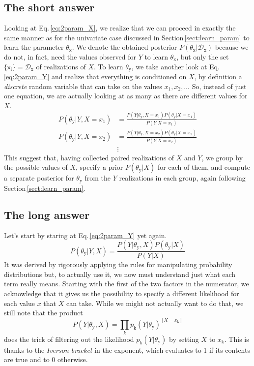 \documentclass[]{report}
\begin{document}
\subsection{The short answer}
Looking at Eq.\,\ref{eq:2param_X}, we realize that we can proceed in exactly the same manner as for the univariate case discussed in Section\,\ref{sect:learn_param} to learn the parameter $\theta_\mathrm{x}$. We denote the obtained posterior $P( \theta_\mathrm{x} | \mathcal{D}_\mathrm{x} ) $ because we do not, in fact, need the values observed for $Y$ to learn $\theta_\mathrm{x}$, but only the set $\{\mathsf{x}_\mathrm{i}\} = \mathcal{D}_\mathrm{x}$ of realizations of $X$. To learn $\theta_\mathrm{y}$, we take another look at Eq.\,\ref{eq:2param_Y} and realize that everything is conditioned on $X$, by definition a \emph{discrete} random variable that can take on the values $x_1, x_2, \ldots$ So, instead of just one equation, we are actually looking at as many as there are different values for $X$.
\begin{align}
P( \theta_\mathrm{y} | Y, X = x_1 )
&= 
\frac
	{
		P( Y | \theta_\mathrm{y}, X = x_1 )
		P( \theta_\mathrm{y} | X = x_1 )
	}
	{
		P( Y | X = x_1 )
	}
\nonumber \\
P( \theta_\mathrm{y} | Y, X = x_2 )
&=
\frac
	{
		P( Y | \theta_\mathrm{y}, X = x_2 )
		P( \theta_\mathrm{y} | X = x_2 )
	}
	{
		P( Y | X=x_2 )
	}
\\
&\vdots
\nonumber
\end{align}
This suggest that, having collected paired realizations of $X$ and $Y$, we group by the possible values of $X$, specify a prior $P( \theta_\mathrm{y} | X ) $ for each of them, and compute a separate posterior for $\theta_\mathrm{y}$ from the $Y$ realizations in each group, again following Section\,\ref{sect:learn_param}.


\subsection{The long answer}
Let's start by staring at Eq.\,\ref{eq:2param_Y} yet again.
\begin{equation*}
P( \theta_\mathrm{y} | Y, X ) 
=
\frac
	{
		P( Y | \theta_\mathrm{y}, X )
		P( \theta_\mathrm{y} | X )
	}
	{
		P( Y | X )
	}
\end{equation*}
It was derived by rigorously applying the rules for manipulating probability distributions but, to actually use it, we now must understand just what each term really means. Starting with the first of the two factors in the numerator, we acknowledge that it gives us the possibility to specify a different likelihood for each value $x$ that $X$ can take. While we might not actually want to do that, we still note that the product
\begin{equation} \label{eq:2param_likelihood_Y}
P( Y | \theta_\mathrm{y}, X ) 
=
\prod_{k}
	{
		p_\mathrm{k}( Y | \theta_\mathrm{y} )
	}
	^
	{
		[ X = x_\mathrm{k} ]
	}
\end{equation} 
does the trick of filtering out the likelihood $p_\mathrm{k}( Y | \theta_\mathrm{y} ) $ by setting $X$ to $x_\mathrm{k}$. This is thanks to the \emph{Iverson bracket} in the exponent, which evaluates to 1 if its contents are true and to 0 otherwise.
\end{document}
